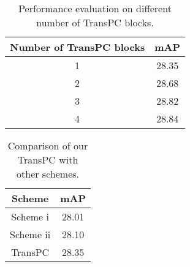 \documentclass[final]{cvpr}
\begin{document}
\begin{table} [t]
\begin{center}
\small
\begin{tabular}{c|c}
\toprule
Number of TransPC blocks & mAP  \\
\midrule
1 & 28.35 \\
2 & 28.68 \\
3 & 28.82 \\
4 & 28.84 \\
\bottomrule
\end{tabular}
\end{center}
\vspace{-5mm}
\caption{Performance evaluation on different number  of  TransPC  blocks.}
\vspace{-3mm}
\label{number of blocks}
\end{table}

\begin{table} [t]
\begin{center}
\small
\begin{tabular}{c|c}
\toprule
Scheme & mAP  \\
\midrule
Scheme i & 28.01 \\
Scheme ii & 28.10 \\
TransPC & 28.35 \\

\bottomrule
\end{tabular}
\end{center}
\vspace{-5mm}
\caption{Comparison of our TransPC with other schemes.}
\vspace{-1mm}
\label{schemes}
\end{table}

\end{document}
